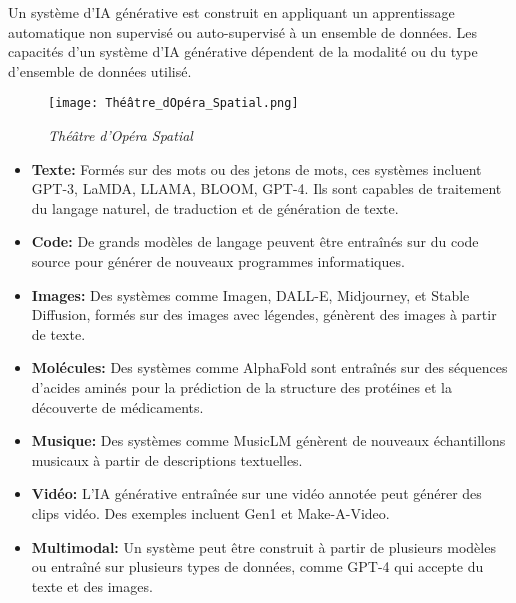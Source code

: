 \documentclass[12pt,a4paper]{article}
\begin{document}
Un système d'IA générative est construit en appliquant un apprentissage automatique non supervisé ou auto-supervisé à un ensemble de données. Les capacités d'un système d'IA générative dépendent de la modalité ou du type d'ensemble de données utilisé.
\begin{wrapfigure}{l}{0.4\textwidth}
    \centering
    \vspace{-15pt} %
    \texttt{[image: Théâtre\_dOpéra\_Spatial.png]}
    \caption*{\footnotesize \textit{Théâtre d'Opéra Spatial}}
    \vspace{-15pt} %
\end{wrapfigure}
%
\begin{itemize}
    \item \textbf{Texte:} Formés sur des mots ou des jetons de mots, ces systèmes incluent GPT-3, LaMDA, LLAMA, BLOOM, GPT-4. Ils sont capables de traitement du langage naturel, de traduction et de génération de texte.
    
    \item \textbf{Code:} De grands modèles de langage peuvent être entraînés sur du code source pour générer de nouveaux programmes informatiques.
    
    \item \textbf{Images:} Des systèmes comme Imagen, DALL-E, Midjourney, et Stable Diffusion, formés sur des images avec légendes, génèrent des images à partir de texte.

    \item \textbf{Molécules:} Des systèmes comme AlphaFold sont entraînés sur des séquences d'acides aminés pour la prédiction de la structure des protéines et la découverte de médicaments.

    \item \textbf{Musique:} Des systèmes comme MusicLM génèrent de nouveaux échantillons musicaux à partir de descriptions textuelles.
    
    \item \textbf{Vidéo:} L'IA générative entraînée sur une vidéo annotée peut générer des clips vidéo. Des exemples incluent Gen1 et Make-A-Video.
    
    \item \textbf{Multimodal:} Un système peut être construit à partir de plusieurs modèles ou entraîné sur plusieurs types de données, comme GPT-4 qui accepte du texte et des images.
\end{itemize}
\end{document}

